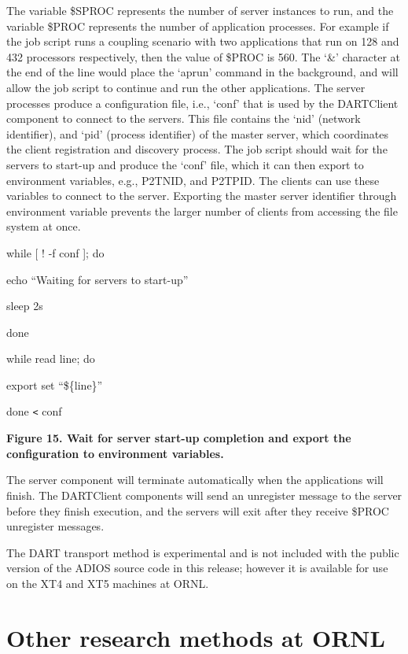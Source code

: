 \leftskip=0pt
The variable \$SPROC represents the number of server instances to run, and the 
variable \$PROC represents the number of application processes. For example if 
the job script runs a coupling scenario with two applications that run on 128 and 
432 processors respectively, then the value of \$PROC is 560. The `\&' character 
at the end of the line would place the `aprun' command in the background, and will 
allow the job script to continue and run the other applications. The server processes 
produce a configuration file, i.e., `conf' that is used by the DARTClient component 
to connect to the servers. This file contains the `nid' (network identifier), and 
`pid' (process identifier) of the master server, which coordinates the client registration 
and discovery process. The job script should wait for the servers to start-up and 
produce the `conf' file, which it can then export to environment variables, e.g., 
P2TNID, and P2TPID. The clients can use these variables to connect to the server. 
Exporting the master server identifier through environment variable prevents the 
larger number of clients from accessing the file system at once.

\leftskip=18pt
while [ ! -f conf ]; do

\parindent=14pt
echo ``Waiting for servers to start-up''

sleep 2s

done

while read line; do

\parindent=28pt
export set ``\$\{line\}''

\parindent=0pt
done \texttt{<} conf

\label{HToc144350174}

{\color{color20} \textbf{Figure 15. Wait for server start-up completion and export 
the configuration to environment variables.}}

\leftskip=0pt
The server component will terminate automatically when the applications will finish. 
The DARTClient components will send an unregister message to the server before 
they finish execution, and the servers will exit after they receive \$PROC unregister 
messages.

The DART transport method is experimental and is not included with the public version 
of the ADIOS source code in this release; however it is available for use on the 
XT4 and XT5 machines at ORNL.\label{HToc182553393}

\section{Other research methods at ORNL}

